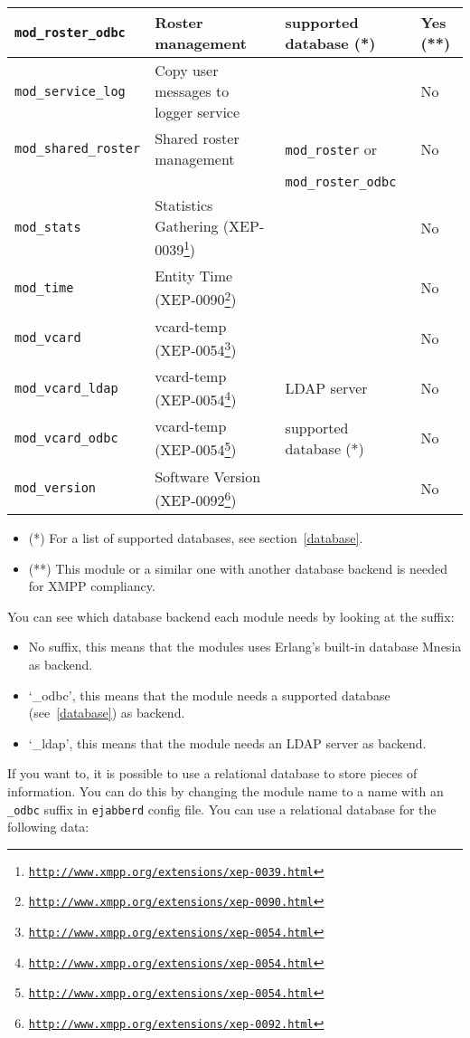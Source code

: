 \documentclass[a4paper,10pt]{book}
\newcommand{\term}[1]{\texttt{#1}}
\newcommand{\ejabberd}{\texttt{ejabberd}}
\newcommand{\module}[1]{\texttt{#1}}
\newcommand{\modroster}{\module{mod\_roster}}
\newcommand{\modrosterodbc}{\module{mod\_roster\_odbc}}
\newcommand{\modservicelog}{\module{mod\_service\_log}}
\newcommand{\modsharedroster}{\module{mod\_shared\_roster}}
\newcommand{\modstats}{\module{mod\_stats}}
\newcommand{\modtime}{\module{mod\_time}}
\newcommand{\modvcard}{\module{mod\_vcard}}
\newcommand{\modvcardldap}{\module{mod\_vcard\_ldap}}
\newcommand{\modvcardodbc}{\module{mod\_vcard\_odbc}}
\newcommand{\modversion}{\module{mod\_version}}
\gdef\footahref#1#2{#2\footnote{\href{#1}{\texttt{#1}}}}
\newcommand{\txepref}[2]{\footahref{http://www.xmpp.org/extensions/xep-#1.html}{#2}}
\newcommand{\xepref}[1]{\txepref{#1}{XEP-#1}}
\begin{document}
\begin{table}[H]
\begin{tabular}{|l|l|l|l|}
    \hline \modrosterodbc{} & Roster management & supported database (*) & Yes (**) \\ 
    \hline \modservicelog{} & Copy user messages to logger service &  & No \\ 
    \hline \modsharedroster{} & Shared roster management & \modroster{} or & No \\ 
    & & \modrosterodbc{} & \\ 
    \hline \modstats{} & Statistics Gathering (\xepref{0039}) &  & No \\ 
    \hline \modtime{} & Entity Time (\xepref{0090}) &  & No \\ 
    \hline \modvcard{} & vcard-temp (\xepref{0054}) &  & No \\ 
    \hline \modvcardldap{} & vcard-temp (\xepref{0054}) & LDAP server & No \\ 
    \hline \modvcardodbc{} & vcard-temp (\xepref{0054}) & supported database (*) & No \\ 
    \hline \modversion{} & Software Version (\xepref{0092}) &  & No\\
    \hline
  \end{tabular}
\end{table}

\begin{itemize}
\item (*) For a list of supported databases, see section~\ref{database}.
\item (**) This module or a similar one with another database backend is needed for
XMPP compliancy.
\end{itemize}

You can see which database backend each module needs by looking at the suffix:
\begin{itemize}
\item No suffix, this means that the modules uses Erlang's built-in database
  Mnesia as backend.
\item `\_odbc', this means that the module needs a supported database
  (see~\ref{database}) as backend.
\item `\_ldap', this means that the module needs an LDAP server as backend.
\end{itemize}

If you want to,
it is possible to use a relational database to store pieces of
information. You can do this by changing the module name to a name with an
\term{\_odbc} suffix in \ejabberd{} config file. You can use a relational
database for the following data:
\end{document}
